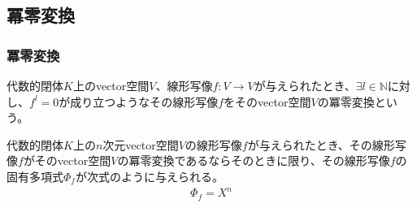 \documentclass[dvipdfmx]{jsarticle}
\begin{document}
\subsection{冪零変換}%
\subsubsection{冪零変換}%
\begin{dfn}
代数的閉体$K$上のvector空間$V$、線形写像$f:V \rightarrow V$が与えられたとき、$\exists l \in \mathbb{N}$に対し、$f^{l} = 0$が成り立つようなその線形写像$f$をそのvector空間$V$の冪零変換という。
\end{dfn}
\begin{thm}\label{2.2.5.1}
代数的閉体$K$上の$n$次元vector空間$V$の線形写像$f$が与えられたとき、その線形写像$f$がそのvector空間$V$の冪零変換であるならそのときに限り、その線形写像$f$の固有多項式$\varPhi_{f}$が次式のように与えられる。
\begin{align*}
\varPhi_{f} = X^{n}
\end{align*}
\end{thm}
\end{document}
